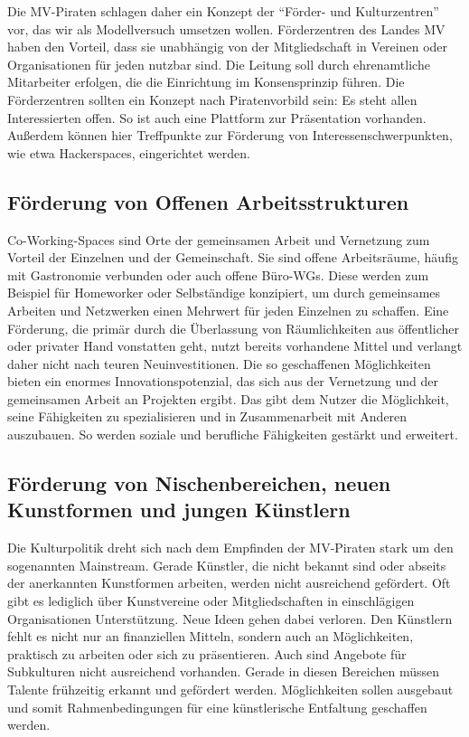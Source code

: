Die MV-Piraten schlagen daher ein Konzept der ``Förder- und Kulturzentren'' vor, das wir als Modellversuch umsetzen wollen. Förderzentren des Landes MV haben den Vorteil, dass sie unabhängig von der Mitgliedschaft in Vereinen oder Organisationen für jeden nutzbar sind. Die Leitung soll durch ehrenamtliche Mitarbeiter erfolgen, die die Einrichtung im Konsensprinzip führen. Die Förderzentren sollten ein Konzept nach Piratenvorbild sein: Es steht allen Interessierten offen. So ist auch eine Plattform zur Präsentation vorhanden. Außerdem können hier Treffpunkte zur Förderung von Interessenschwerpunkten, wie etwa Hackerspaces, eingerichtet werden.

\subsection{Förderung von Offenen Arbeitsstrukturen}

Co-Working-Spaces sind Orte der gemeinsamen Arbeit und Vernetzung zum Vorteil der Einzelnen und der Gemeinschaft. Sie sind offene Arbeitsräume, häufig mit Gastronomie verbunden oder auch offene Büro-WGs. Diese werden zum Beispiel für Homeworker oder Selbständige konzipiert, um durch gemeinsames Arbeiten und Netzwerken einen Mehrwert für jeden Einzelnen zu schaffen. Eine Förderung, die primär durch die Überlassung von Räumlichkeiten aus öffentlicher oder privater Hand vonstatten geht, nutzt bereits vorhandene Mittel und verlangt daher nicht nach teuren Neuinvestitionen. Die so geschaffenen Möglichkeiten bieten ein enormes Innovationspotenzial, das sich aus der Vernetzung und der gemeinsamen Arbeit an Projekten ergibt. Das gibt dem Nutzer die Möglichkeit, seine Fähigkeiten zu spezialisieren und in Zusammenarbeit mit Anderen auszubauen. So werden soziale und berufliche Fähigkeiten gestärkt und erweitert.

\subsection{Förderung von Nischenbereichen, neuen Kunstformen und jungen Künstlern}

Die Kulturpolitik dreht sich nach dem Empfinden der MV-Piraten stark um den sogenannten Mainstream. Gerade Künstler, die nicht bekannt sind oder abseits der anerkannten Kunstformen arbeiten, werden nicht ausreichend gefördert. Oft gibt es lediglich über Kunstvereine oder Mitgliedschaften in einschlägigen Organisationen Unterstützung. Neue Ideen gehen dabei verloren. Den Künstlern fehlt es nicht nur an finanziellen Mitteln, sondern auch an Möglichkeiten, praktisch zu arbeiten oder sich zu präsentieren. Auch sind Angebote für Subkulturen nicht ausreichend vorhanden. Gerade in diesen Bereichen müssen Talente frühzeitig erkannt und gefördert werden. Möglichkeiten sollen ausgebaut und somit Rahmenbedingungen für eine künstlerische Entfaltung geschaffen werden.

